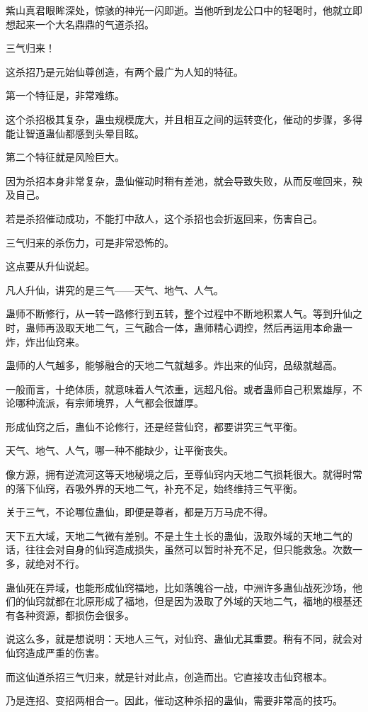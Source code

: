 \begin{this_body}
紫山真君眼眸深处，惊骇的神光一闪即逝。当他听到龙公口中的轻喝时，他就立即想起来一个大名鼎鼎的气道杀招。

三气归来！

这杀招乃是元始仙尊创造，有两个最广为人知的特征。

第一个特征是，非常难练。

这个杀招极其复杂，蛊虫规模庞大，并且相互之间的运转变化，催动的步骤，多得能让智道蛊仙都感到头晕目眩。

第二个特征就是风险巨大。

因为杀招本身非常复杂，蛊仙催动时稍有差池，就会导致失败，从而反噬回来，殃及自己。

若是杀招催动成功，不能打中敌人，这个杀招也会折返回来，伤害自己。

三气归来的杀伤力，可是非常恐怖的。

这点要从升仙说起。

凡人升仙，讲究的是三气——天气、地气、人气。

蛊师不断修行，从一转一路修行到五转，整个过程中不断地积累人气。等到升仙之时，蛊师再汲取天地二气，三气融合一体，蛊师精心调控，然后再运用本命蛊一炸，炸出仙窍来。

蛊师的人气越多，能够融合的天地二气就越多。炸出来的仙窍，品级就越高。

一般而言，十绝体质，就意味着人气浓重，远超凡俗。或者蛊师自己积累雄厚，不论哪种流派，有宗师境界，人气都会很雄厚。

形成仙窍之后，蛊仙不论修行，还是经营仙窍，都要讲究三气平衡。

天气、地气、人气，哪一种不能缺少，让平衡丧失。

像方源，拥有逆流河这等天地秘境之后，至尊仙窍内天地二气损耗很大。就得时常的落下仙窍，吞吸外界的天地二气，补充不足，始终维持三气平衡。

关于三气，不论哪位蛊仙，即便是尊者，都是万万马虎不得。

天下五大域，天地二气微有差别。不是土生土长的蛊仙，汲取外域的天地二气的话，往往会对自身的仙窍造成损失，虽然可以暂时补充不足，但只能救急。次数一多，就绝对不行。

蛊仙死在异域，也能形成仙窍福地，比如落魄谷一战，中洲许多蛊仙战死沙场，他们的仙窍就都在北原形成了福地，但是因为汲取了外域的天地二气，福地的根基还有各种资源，都损伤会很多。

说这么多，就是想说明：天地人三气，对仙窍、蛊仙尤其重要。稍有不同，就会对仙窍造成严重的伤害。

而这仙道杀招三气归来，就是针对此点，创造而出。它直接攻击仙窍根本。

乃是连招、变招两相合一。因此，催动这种杀招的蛊仙，需要非常高的技巧。


\end{this_body}
